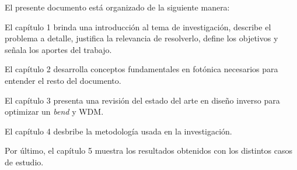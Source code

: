 El presente documento está organizado de la siguiente manera:

El capítulo 1 brinda una introducción al tema de investigación, describe el problema a detalle, justifica la relevancia de resolverlo, define los objetivos y señala los aportes del trabajo.

El capítulo 2 desarrolla conceptos fundamentales en fotónica necesarios para entender el resto del documento.


El capítulo 3 presenta una revisión del estado del arte en diseño inverso para
optimizar un \emph{bend} y WDM.


El capítulo 4 desbribe la metodología usada en la investigación.


Por último, el capítulo 5 muestra los resultados obtenidos con los distintos casos de estudio. 


 
